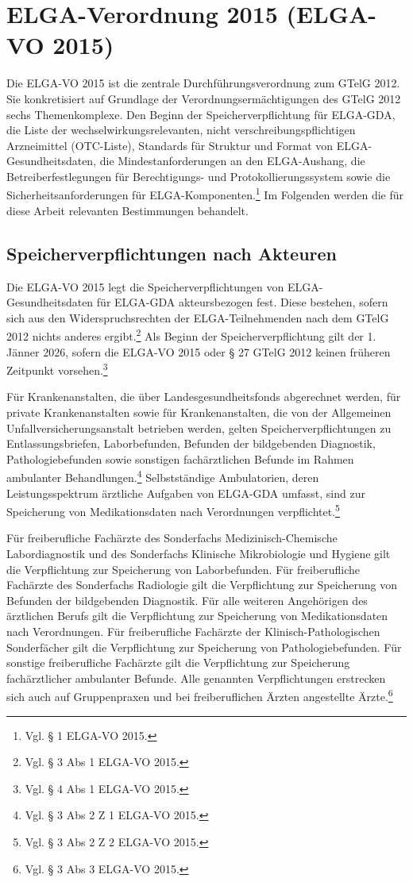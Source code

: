 \section{ELGA-Verordnung 2015 (ELGA-VO 2015)}
Die ELGA-VO 2015 ist die zentrale Durchführungsverordnung zum GTelG 2012. Sie konkretisiert auf Grundlage der Verordnungsermächtigungen des GTelG 2012 sechs Themenkomplexe. Den Beginn der Speicherverpflichtung für ELGA-GDA, die Liste der wechselwirkungsrelevanten, nicht verschreibungspflichtigen Arzneimittel (OTC-Liste), Standards für Struktur und Format von ELGA-Gesundheitsdaten, die Mindestanforderungen an den ELGA-Aushang, die Betreiberfestlegungen für Berechtigungs- und Protokollierungssystem sowie die Sicherheitsanforderungen für ELGA-Komponenten.\footnote{Vgl. § 1 ELGA-VO 2015.} Im Folgenden werden die für diese Arbeit relevanten Bestimmungen behandelt.

        \subsection{Speicherverpflichtungen nach Akteuren}
Die ELGA-VO 2015 legt die Speicherverpflichtungen von ELGA-Gesundheitsdaten für ELGA-GDA akteursbezogen fest. Diese bestehen, sofern sich aus den Widerspruchsrechten der ELGA-Teilnehmenden nach dem GTelG 2012 nichts anderes ergibt.\footnote{Vgl. § 3 Abs 1 ELGA-VO 2015.} Als Beginn der Speicherverpflichtung gilt der 1. Jänner 2026, sofern die ELGA-VO 2015 oder § 27 GTelG 2012 keinen früheren Zeitpunkt vorsehen.\footnote{Vgl. § 4 Abs 1 ELGA-VO 2015.}

Für Krankenanstalten, die über Landesgesundheitsfonds abgerechnet werden, für private Krankenanstalten sowie für Krankenanstalten, die von der Allgemeinen Unfallversicherungsanstalt betrieben werden, gelten Speicherverpflichtungen zu Entlassungsbriefen, Laborbefunden, Befunden der bildgebenden Diagnostik, Pathologiebefunden sowie sonstigen fachärztlichen Befunde im Rahmen ambulanter Behandlungen.\footnote{Vgl. § 3 Abs 2 Z 1 ELGA-VO 2015.} Selbstständige Ambulatorien, deren Leistungsspektrum ärztliche Aufgaben von ELGA-GDA umfasst, sind zur Speicherung von Medikationsdaten nach Verordnungen verpflichtet.\footnote{Vgl. § 3 Abs 2 Z 2 ELGA-VO 2015.}

Für freiberufliche Fachärzte des Sonderfachs Medizinisch-Chemische Labordiagnostik und des Sonderfachs Klinische Mikrobiologie und Hygiene gilt die Verpflichtung zur Speicherung von Laborbefunden. Für freiberufliche Fachärzte des Sonderfachs Radiologie gilt die Verpflichtung zur Speicherung von Befunden der bildgebenden Diagnostik. Für alle weiteren Angehörigen des ärztlichen Berufs gilt die Verpflichtung zur Speicherung von Medikationsdaten nach Verordnungen. Für freiberufliche Fachärzte der Klinisch-Pathologischen Sonderfächer gilt die Verpflichtung zur Speicherung von Pathologiebefunden. Für sonstige freiberufliche Fachärzte gilt die Verpflichtung zur Speicherung fachärztlicher ambulanter Befunde. Alle genannten Verpflichtungen erstrecken sich auch auf Gruppenpraxen und bei freiberuflichen Ärzten angestellte Ärzte.\footnote{Vgl. § 3 Abs 3 ELGA-VO 2015.}

